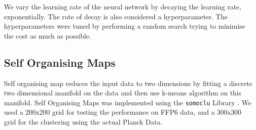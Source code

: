 We vary the learning rate of the neural network by decaying the learning rate, exponentially. The rate of decay is also
considered a hyperparameter. The hyperparameters were tuned by performing a random search trying to minimise the cost as much as
possible.

\subsection{Self Organising Maps}
Self organising map reduces the input data to two dimensions by fitting a discrete two dimensional
manifold on the data and then use k-means algorithm on this manifold.
Self Organising Maps was implemented using the \texttt{somoclu} Library \cite{somoclu}.
We used a 200x200 grid for testing the performance on FFP6 data, and a 300x300 grid for the clustering using the actual Planck Data.

